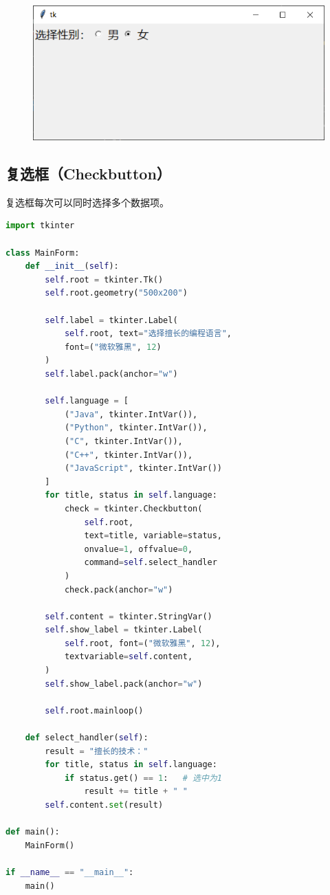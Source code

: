 \begin{tcolorbox}
	\begin{figure}[H]
		\centering
		\includegraphics[]{img/C13/13-4/2.png}
	\end{figure}
\end{tcolorbox}

\vspace{0.5cm}

\subsection{复选框（Checkbutton）}

复选框每次可以同时选择多个数据项。\\


\begin{lstlisting}[language=Python]
import tkinter

class MainForm:
    def __init__(self):
        self.root = tkinter.Tk()
        self.root.geometry("500x200")

        self.label = tkinter.Label(
            self.root, text="选择擅长的编程语言",
            font=("微软雅黑", 12)
        )
        self.label.pack(anchor="w")

        self.language = [
            ("Java", tkinter.IntVar()),
            ("Python", tkinter.IntVar()),
            ("C", tkinter.IntVar()),
            ("C++", tkinter.IntVar()),
            ("JavaScript", tkinter.IntVar())
        ]
        for title, status in self.language:
            check = tkinter.Checkbutton(
                self.root,
                text=title, variable=status,
                onvalue=1, offvalue=0,
                command=self.select_handler
            )
            check.pack(anchor="w")
        
        self.content = tkinter.StringVar()
        self.show_label = tkinter.Label(
            self.root, font=("微软雅黑", 12),
            textvariable=self.content,
        )
        self.show_label.pack(anchor="w")

        self.root.mainloop()
    
    def select_handler(self):
        result = "擅长的技术："
        for title, status in self.language:
            if status.get() == 1:   # 选中为1
                result += title + " "
        self.content.set(result)

def main():
    MainForm()

if __name__ == "__main__":
    main()
\end{lstlisting}

